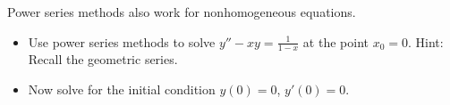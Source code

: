 \documentclass{ximera}
\begin{document}
\begin{exercise}%
    Power series methods also work for nonhomogeneous equations.
    \begin{itemize}
        \item Use power series methods to solve $y'' - x y = \frac{1}{1-x}$ at the point $x_0 = 0$. Hint: Recall the geometric series.
        \item Now solve for the initial condition $y(0)=0$, $y'(0) = 0$.
    \end{itemize}
\end{exercise}

\end{document}
